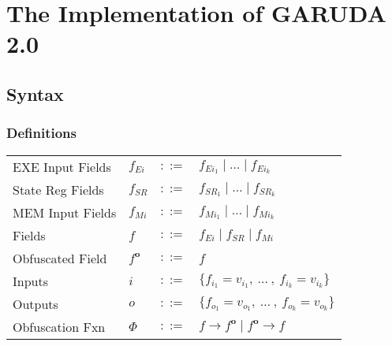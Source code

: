 \documentclass[12pt, letterpaper]{article}
\def \sysname {\textsc{GARUDA 2.0}\xspace}
\newcommand\obf[1]{#1^\mathbf{o}}
\begin{document}


  \section{The Implementation of \sysname}\label{sec:spec}

    \subsection{Syntax}\label{sec:spec:synt}
      \subsubsection{Definitions}\label{sec:spec:synt:defn}
          {\centering
          \begin{tabular}{l l c l}
            EXE Input Fields & $f_{Ei}$  & $::=$ & $f_{Ei_{1}} \mid \dots \mid f_{Ei_{k}}$\\
            State Reg Fields & $f_{SR}$  & $::=$ & $f_{SR_{1}} \mid \dots \mid f_{SR_{k}}$\\
            MEM Input Fields & $f_{Mi}$  & $::=$ & $f_{Mi_{1}} \mid \dots \mid f_{Mi_{k}}$\\
            Fields           & $f$       & $::=$ & $f_{Ei} \mid f_{SR} \mid f_{Mi} $ \\
            Obfuscated Field & $\obf{f}$ & $::=$ & $f$\\
            Inputs           & $i$       & $::=$ & $\{f_{i_{1}} = v_{i_{1}} ,\ \dots\ ,\ f_{i_{k}} = v_{i_{k}}\}$\\
            Outputs          & $o$       & $::=$ & $\{f_{o_{1}} = v_{o_{1}} ,\ \dots\ ,\ f_{o_{k}} = v_{o_{k}}\}$\\
            Obfuscation Fxn  & $\Phi$    & $::=$ & $f \rightarrow \obf{f} \mid \obf{f} \rightarrow f$
          \end{tabular}}
\end{document}
